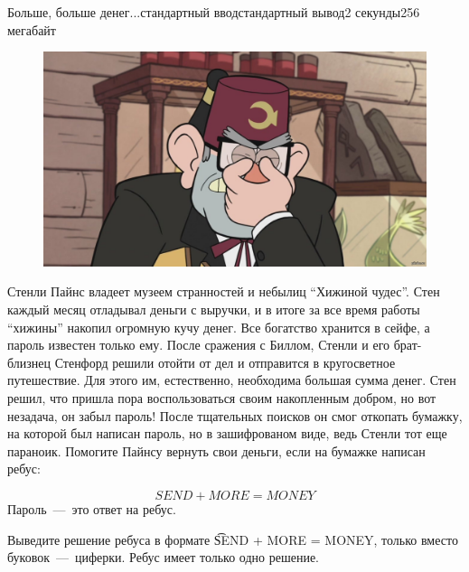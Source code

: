 \begin{problem}{Больше, больше денег...}{стандартный ввод}{стандартный вывод}{2 секунды}{256 мегабайт}

\begin{figure}[h]
\hspace*{\fill}
\includegraphics[width=\linewidth,natwidth=1280,natheight=718]{Stanley.JPG}
\hspace*{\fill}
\end{figure}


Стенли Пайнс владеет музеем странностей и небылиц ``Хижиной чудес''. Стен каждый месяц отладывал деньги с выручки, и в итоге за все время работы ``хижины'' накопил огромную кучу денег. Все богатство хранится в сейфе, а пароль известен только ему. После сражения с Биллом, Стенли и его брат-близнец Стенфорд решили отойти от дел и отправится в кругосветное путешествие. Для этого им, естественно, необходима большая сумма денег. Стен решил, что пришла пора воспользоваться своим накопленным добром, но вот незадача, он забыл пароль! После тщательных поисков он смог откопать бумажку, на которой был написан пароль, но в зашифрованом виде, ведь Стенли тот еще параноик. Помогите Пайнсу вернуть свои деньги, если на бумажке написан ребус:

\begin{equation*}
	SEND + MORE = MONEY
\end{equation*} 
Пароль~---~это ответ на ребус.

\OutputFile
Выведите решение ребуса в формате \t{SEND + MORE = MONEY}, только вместо буковок~---~циферки. Ребус имеет только одно решение.


\end{problem}


